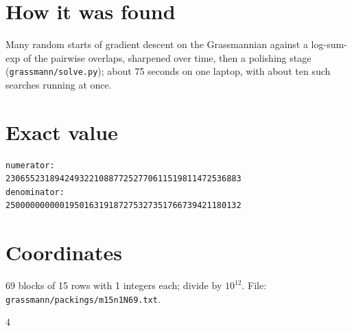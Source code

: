 \documentclass[11pt,a4paper]{article}
\begin{document}
\section{How it was found}
Many random starts of gradient descent on the Grassmannian against a log-sum-exp of the pairwise overlaps, sharpened over time, then a polishing stage (\texttt{grassmann/solve.py}); about 75 seconds on one laptop, with about ten such searches running at once.


\appendix
\section{Exact value}
{\small
\begin{verbatim}
numerator:
230655231894249322108877252770611519811472536883
denominator:
250000000000195016319187275327351766739421180132
\end{verbatim}}

\section{Coordinates}
69 blocks of 15 rows with 1 integers each; divide by $10^{12}$. File: \texttt{grassmann/packings/m15n1N69.txt}.
{\tiny
\begin{multicols}{4}
\end{multicols}}
\end{document}
